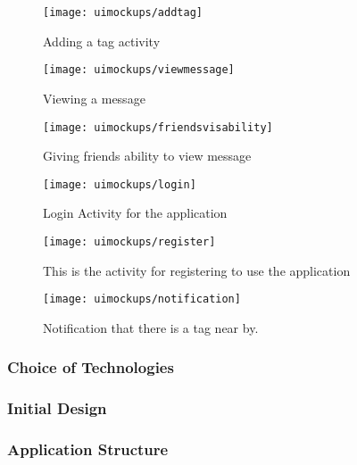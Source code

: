 \begin{figure}[p]
    \centering
    \texttt{[image: uimockups/addtag]}
    \caption{Adding a tag activity}
    \label{fig:add_tag_activity_image}
\end{figure}

\begin{figure}[p]
    \centering
    \texttt{[image: uimockups/viewmessage]}
    \caption{Viewing a message}
    \label{fig:viewing_message_image}
\end{figure}

\begin{figure}[p]
    \centering
    \texttt{[image: uimockups/friendsvisability]}
    \caption{Giving friends ability to view message}
    \label{fig:giving_friends_visability_image}
\end{figure}

\begin{figure}[p]
    \centering
    \texttt{[image: uimockups/login]}
    \caption{Login Activity for the application}
    \label{fig:login_activity_image}
\end{figure}

\begin{figure}[p]
    \centering
    \texttt{[image: uimockups/register]}
    \caption{This is the activity for registering to use the application}
    \label{fig:registration_activity_image}
\end{figure}

\begin{figure}[p]
    \centering
    \texttt{[image: uimockups/notification]}
    \caption{Notification that there is a tag near by.}
    \label{fig:postman_image}
\end{figure}



\subsubsection*{Choice of Technologies}

\subsubsection*{Initial Design}

\subsubsection*{Application Structure}

